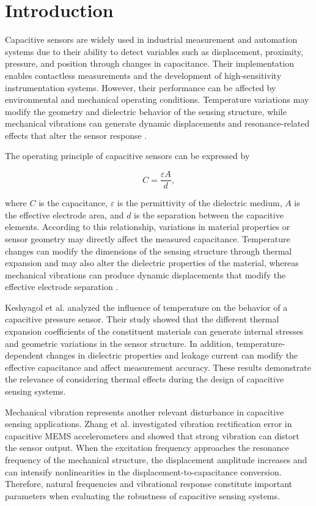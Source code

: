 \documentclass[conference]{IEEEtran}
\begin{document}
\section{Introduction}

Capacitive sensors are widely used in industrial measurement and automation systems due to their ability to detect variables such as displacement, proximity, pressure, and position through changes in capacitance. Their implementation enables contactless measurements and the development of high-sensitivity instrumentation systems. However, their performance can be affected by environmental and mechanical operating conditions. Temperature variations may modify the geometry and dielectric behavior of the sensing structure, while mechanical vibrations can generate dynamic displacements and resonance-related effects that alter the sensor response \cite{Keshyagol2024,Zhang2024}.

The operating principle of capacitive sensors can be expressed by

\begin{equation}
C=\frac{\varepsilon A}{d},
\end{equation}

where $C$ is the capacitance, $\varepsilon$ is the permittivity of the dielectric medium, $A$ is the effective electrode area, and $d$ is the separation between the capacitive elements. According to this relationship, variations in material properties or sensor geometry may directly affect the measured capacitance. Temperature changes can modify the dimensions of the sensing structure through thermal expansion and may also alter the dielectric properties of the material, whereas mechanical vibrations can produce dynamic displacements that modify the effective electrode separation \cite{Keshyagol2024,Zhang2024}.

Keshyagol et al. \cite{Keshyagol2024} analyzed the influence of temperature on the behavior of a capacitive pressure sensor. Their study showed that the different thermal expansion coefficients of the constituent materials can generate internal stresses and geometric variations in the sensor structure. In addition, temperature-dependent changes in dielectric properties and leakage current can modify the effective capacitance and affect measurement accuracy. These results demonstrate the relevance of considering thermal effects during the design of capacitive sensing systems.

Mechanical vibration represents another relevant disturbance in capacitive sensing applications. Zhang et al. \cite{Zhang2024} investigated vibration rectification error in capacitive MEMS accelerometers and showed that strong vibration can distort the sensor output. When the excitation frequency approaches the resonance frequency of the mechanical structure, the displacement amplitude increases and can intensify nonlinearities in the displacement-to-capacitance conversion. Therefore, natural frequencies and vibrational response constitute important parameters when evaluating the robustness of capacitive sensing systems.
\end{document}

